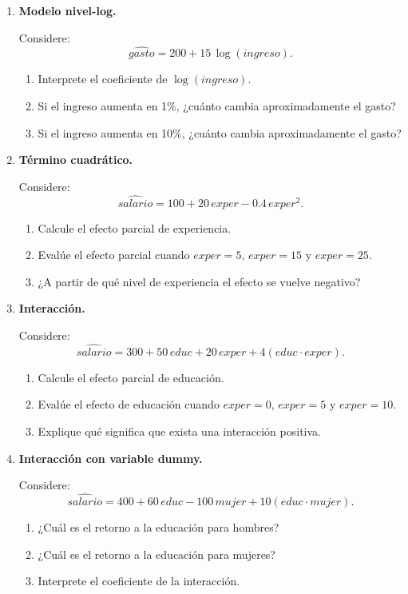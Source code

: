 \documentclass[11pt]{article}
\begin{document}
\begin{enumerate}[label=\textbf{Ejercicio \arabic*.}, leftmargin=*]
\item \textbf{Modelo nivel-log.}

Considere:
\[
\widehat{gasto}=200+15\,\log(ingreso).
\]

\begin{enumerate}[label=\alph*)]
    \item Interprete el coeficiente de \(\log(ingreso)\).
    \item Si el ingreso aumenta en 1\%, ¿cuánto cambia aproximadamente el gasto?
    \item Si el ingreso aumenta en 10\%, ¿cuánto cambia aproximadamente el gasto?
\end{enumerate}

\item \textbf{Término cuadrático.}

Considere:
\[
\widehat{salario}=100+20\,exper-0.4\,exper^2.
\]

\begin{enumerate}[label=\alph*)]
    \item Calcule el efecto parcial de experiencia.
    \item Evalúe el efecto parcial cuando \(exper=5\), \(exper=15\) y \(exper=25\).
    \item ¿A partir de qué nivel de experiencia el efecto se vuelve negativo?
\end{enumerate}

\item \textbf{Interacción.}

Considere:
\[
\widehat{salario}=300+50\,educ+20\,exper+4(educ\cdot exper).
\]

\begin{enumerate}[label=\alph*)]
    \item Calcule el efecto parcial de educación.
    \item Evalúe el efecto de educación cuando \(exper=0\), \(exper=5\) y \(exper=10\).
    \item Explique qué significa que exista una interacción positiva.
\end{enumerate}

\item \textbf{Interacción con variable dummy.}

Considere:
\[
\widehat{salario}=400+60\,educ-100\,mujer+10(educ\cdot mujer).
\]

\begin{enumerate}[label=\alph*)]
    \item ¿Cuál es el retorno a la educación para hombres?
    \item ¿Cuál es el retorno a la educación para mujeres?
    \item Interprete el coeficiente de la interacción.
\end{enumerate}


\end{enumerate}
\end{document}
